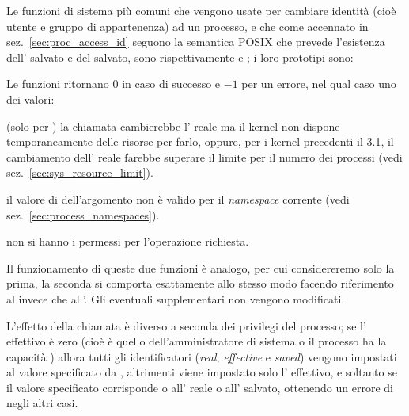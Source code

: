 Le funzioni di sistema più comuni che vengono usate per cambiare identità
(cioè utente e gruppo di appartenenza) ad un processo, e che come accennato in
sez.~\ref{sec:proc_access_id} seguono la semantica POSIX che prevede
l'esistenza dell' salvato e del  salvato, sono
rispettivamente  e ; i loro prototipi sono:

\begin{funcproto}{
}
{Le funzioni ritornano $0$ in caso di successo e $-1$ per un errore, nel qual
caso  uno dei valori: 
\begin{errlist}
\item[\errcode{EAGAIN}] (solo per ) la chiamata cambierebbe
  l' reale ma il kernel non dispone temporaneamente delle risorse per
  farlo, oppure, per i kernel precedenti il 3.1, il cambiamento
  dell' reale farebbe superare il limite per il numero dei processi
   (vedi sez.~\ref{sec:sys_resource_limit}).
\item[\errcode{EINVAL}] il valore di dell'argomento non è valido per il
    \textit{namespace} corrente (vedi sez.~\ref{sec:process_namespaces}).
\item[\errcode{EPERM}] non si hanno i permessi per l'operazione richiesta.
\end{errlist} 
}
\end{funcproto}

Il funzionamento di queste due funzioni è analogo, per cui considereremo solo
la prima, la seconda si comporta esattamente allo stesso modo facendo
riferimento al  invece che all'. Gli eventuali 
supplementari non vengono modificati.

L'effetto della chiamata è diverso a seconda dei privilegi del processo; se
l' effettivo è zero (cioè è quello dell'amministratore di sistema o
il processo ha la capacità ) allora tutti gli
identificatori (\textit{real}, \textit{effective} e \textit{saved}) vengono
impostati al valore specificato da , altrimenti viene impostato
solo l' effettivo, e soltanto se il valore specificato corrisponde o
all' reale o all' salvato, ottenendo un errore di
 negli altri casi.

